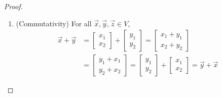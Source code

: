 \begin{proof}
\begin{enumerate}
 \item (Commutativity) For all $\vec{x}, \vec{y}, \vec{z} \in V$, 
\begin{align*}
 \vec{x} + \vec{y} & = \begin{bmatrix}
 x_1 \\ x_2 
 \end{bmatrix} + \begin{bmatrix}
 y_1 \\ y_2 
 \end{bmatrix} = 
\begin{bmatrix}
 x_1 + y_1 \\ x_2 + y_2 
\end{bmatrix}\\
& =  
\begin{bmatrix}
 y_1 + x_1 \\
 y_2 + x_2 
\end{bmatrix} = \begin{bmatrix}
y_1 \\ y_2 
\end{bmatrix} + \begin{bmatrix}
x_1 \\ x_2
\end{bmatrix} = \vec{y} + \vec{x} 
\end{align*}


\end{enumerate}
\end{proof}
